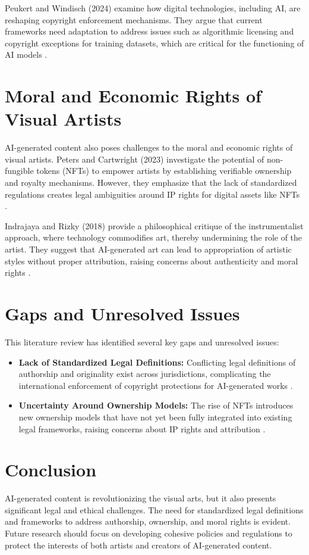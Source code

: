 \documentclass{article}
\begin{document}
Peukert and Windisch (2024) examine how digital technologies, including AI, are reshaping copyright enforcement mechanisms. They argue that current frameworks need adaptation to address issues such as algorithmic licensing and copyright exceptions for training datasets, which are critical for the functioning of AI models \cite{peukert2024economics}.

\section{Moral and Economic Rights of Visual Artists}
AI-generated content also poses challenges to the moral and economic rights of visual artists. Peters and Cartwright (2023) investigate the potential of non-fungible tokens (NFTs) to empower artists by establishing verifiable ownership and royalty mechanisms. However, they emphasize that the lack of standardized regulations creates legal ambiguities around IP rights for digital assets like NFTs \cite{peters2023nfts}.

Indrajaya and Rizky (2018) provide a philosophical critique of the instrumentalist approach, where technology commodifies art, thereby undermining the role of the artist. They suggest that AI-generated art can lead to appropriation of artistic styles without proper attribution, raising concerns about authenticity and moral rights \cite{indrajaya2018techne}.

\section{Gaps and Unresolved Issues}
This literature review has identified several key gaps and unresolved issues:
\begin{itemize}
    \item \textbf{Lack of Standardized Legal Definitions:} Conflicting legal definitions of authorship and originality exist across jurisdictions, complicating the international enforcement of copyright protections for AI-generated works \cite{cebi2023influence}.
    \item \textbf{Uncertainty Around Ownership Models:} The rise of NFTs introduces new ownership models that have not yet been fully integrated into existing legal frameworks, raising concerns about IP rights and attribution \cite{peters2023nfts}.
\end{itemize}

\section{Conclusion}
AI-generated content is revolutionizing the visual arts, but it also presents significant legal and ethical challenges. The need for standardized legal definitions and frameworks to address authorship, ownership, and moral rights is evident. Future research should focus on developing cohesive policies and regulations to protect the interests of both artists and creators of AI-generated content.



\end{document}
